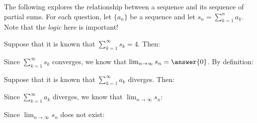 \documentclass{ximera}
\author{Jim Talamo}
\begin{document}
\begin{exercise}

The following explores the relationship between a sequence and its sequence of partial sums.  For each question, let $\{a_n\}$ be a sequence and let $s_n = \sum_{k=1}^n a_k$.  Note that the \emph{logic} here is important!

\begin{exercise}
Suppose that it is known that $\sum_{k=1}^{\infty} s_k = 4$.  Then:
\begin{multipleChoice}
\end{multipleChoice}

\begin{hint}
Since $\sum_{k=1}^{\infty} s_k$ converges, we know that $\lim_{n \to \infty} s_n = \answer{0}$.  By definition:
\begin{multipleChoice}
\end{multipleChoice}

\end{hint}


\end{exercise}

\begin{exercise}
Suppose that it is known that $\sum_{k=1}^{\infty} a_k$ diverges.  Then:
\begin{multipleChoice}
\end{multipleChoice}

\begin{hint}
Since $\sum_{k=1}^{\infty} a_k$ diverges, we know that $\lim_{n \to \infty} s_n$:

\begin{multipleChoice}
\end{multipleChoice}

Since $\lim_{n \to \infty} s_n$ does not exist:

\begin{multipleChoice}
\end{multipleChoice}
\end{hint}


\end{exercise}


\end{exercise}
\end{document}
